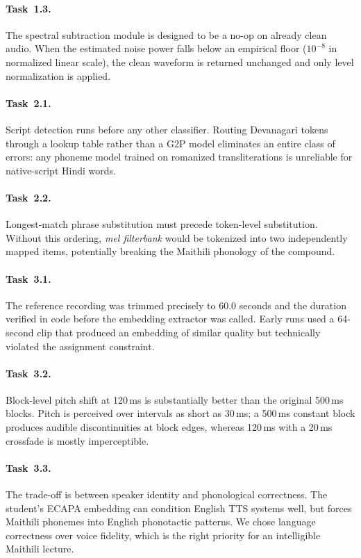 \documentclass[10pt,twocolumn,letterpaper]{article}
\begin{document}
\paragraph{Task~1.3.}
The spectral subtraction module is designed to be a no-op on already
clean audio.  When the estimated noise power falls below an empirical
floor ($10^{-8}$ in normalized linear scale), the clean waveform is
returned unchanged and only level normalization is applied.

\paragraph{Task~2.1.}
Script detection runs before any other classifier.  Routing Devanagari
tokens through a lookup table rather than a G2P model eliminates
an entire class of errors: any phoneme model trained on romanized
transliterations is unreliable for native-script Hindi words.

\paragraph{Task~2.2.}
Longest-match phrase substitution must precede token-level substitution.
Without this ordering, \emph{mel filterbank} would be tokenized into
two independently mapped items, potentially breaking the Maithili
phonology of the compound.

\paragraph{Task~3.1.}
The reference recording was trimmed precisely to 60.0 seconds and
the duration verified in code before the embedding extractor was
called.  Early runs used a 64-second clip that produced an embedding
of similar quality but technically violated the assignment constraint.

\paragraph{Task~3.2.}
Block-level pitch shift at 120\,ms is substantially better than the
original 500\,ms blocks.  Pitch is perceived over intervals as short
as 30\,ms; a 500\,ms constant block produces audible discontinuities
at block edges, whereas 120\,ms with a 20\,ms crossfade is mostly
imperceptible.

\paragraph{Task~3.3.}
The trade-off is between speaker identity and phonological correctness.
The student's ECAPA embedding can condition English TTS systems well,
but forces Maithili phonemes into English phonotactic patterns.  We
chose language correctness over voice fidelity, which is the right
priority for an intelligible Maithili lecture.
\end{document}
